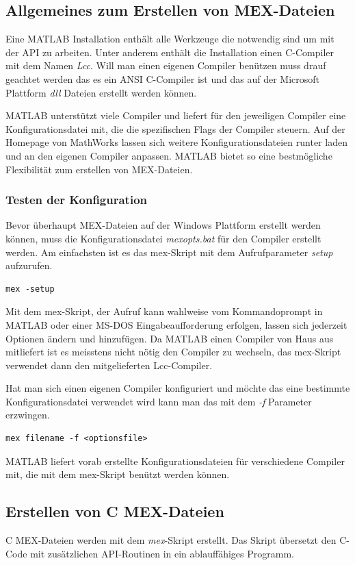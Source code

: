 \documentclass[a4paper,11pt]{article}
\begin{document}
\subsection{Allgemeines zum Erstellen von MEX-Dateien}
Eine MATLAB Installation enthält alle Werkzeuge die notwendig
sind um mit der API zu arbeiten. Unter anderem enthält
die Installation einen C-Compiler mit dem Namen \textit{Lcc}.
Will man einen eigenen Compiler benützen muss drauf geachtet
werden das es ein ANSI C-Compiler ist und das auf
der Microsoft Plattform \textit{dll} Dateien erstellt werden können.

MATLAB unterstützt viele Compiler und liefert für den jeweiligen
Compiler eine Konfigurationsdatei mit, die die spezifischen Flags
der Compiler steuern. Auf der Homepage von MathWorks lassen sich
weitere Konfigurationsdateien runter laden und an den eigenen
Compiler anpassen. MATLAB bietet so eine bestmögliche Flexibilität
zum erstellen von MEX-Dateien.

\subsubsection*{Testen der Konfiguration}
Bevor überhaupt MEX-Dateien auf der Windows Plattform erstellt
werden können, muss die Konfigurationsdatei \textit{mexopts.bat} für den
Compiler erstellt werden. Am einfachsten ist es das mex-Skript mit
dem Aufrufparameter \textit{setup} aufzurufen.
\begin{verbatim}
mex -setup
\end{verbatim}

Mit dem mex-Skript, der Aufruf kann wahlweise vom Kommandoprompt in MATLAB
oder einer MS-DOS Eingabeaufforderung erfolgen, lassen sich jederzeit Optionen
ändern und hinzufügen. Da MATLAB einen Compiler von Haus aus mitliefert
ist es meisstens nicht nötig den Compiler zu wechseln, das mex-Skript
verwendet dann den mitgelieferten Lcc-Compiler.

Hat man sich einen eigenen Compiler konfiguriert und möchte
das eine bestimmte Konfigurationsdatei verwendet wird kann man
das mit dem \textit{-f} Parameter erzwingen.
\begin{verbatim}
mex filename -f <optionsfile>
\end{verbatim}

MATLAB liefert vorab erstellte Konfigurationsdateien für verschiedene
Compiler mit, die mit dem mex-Skript benützt werden können.

\subsection{Erstellen von C MEX-Dateien}
C MEX-Dateien werden mit dem  \textit{mex}-Skript erstellt. Das Skript
übersetzt den C-Code mit zusätzlichen API-Routinen in ein ablauffähiges
Programm.
\end{document}
